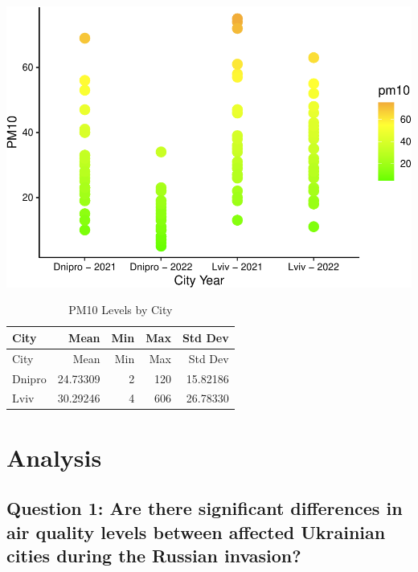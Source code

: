 \documentclass[
  12pt,
]{article}
\begin{document}
\includegraphics{Fontanie_Gordon_Weinberg_Project_files/figure-latex/plot of PM10 air pollution by cityyear-1.pdf}\\

\begin{longtable}[]{@{}lrrrr@{}}
\caption{PM10 Levels by City}\tabularnewline
\toprule
City & Mean & Min & Max & Std Dev \\
\midrule
\endfirsthead
\toprule
City & Mean & Min & Max & Std Dev \\
\midrule
\endhead
Dnipro & 24.73309 & 2 & 120 & 15.82186 \\
Lviv & 30.29246 & 4 & 606 & 26.78330 \\
\bottomrule
\end{longtable}

\newpage

\hypertarget{analysis}{%
\section{Analysis}\label{analysis}}

\hypertarget{question-1-are-there-significant-differences-in-air-quality-levels-between-affected-ukrainian-cities-during-the-russian-invasion}{%
\subsection{Question 1: Are there significant differences in air quality
levels between affected Ukrainian cities during the Russian
invasion?}\label{question-1-are-there-significant-differences-in-air-quality-levels-between-affected-ukrainian-cities-during-the-russian-invasion}}
\end{document}
